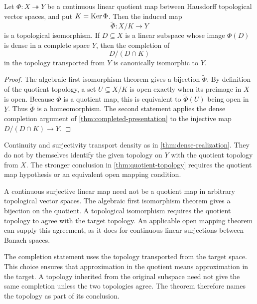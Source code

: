 \begin{theorem}
\label{thm:quotient-topology}
Let $\Phi:X\twoheadrightarrow Y$ be a continuous linear quotient map between Hausdorff topological vector spaces, and put $K=\operatorname{Ker}\Phi$.  Then the induced map
\[
\widetilde\Phi:X/K\longrightarrow Y
\]
is a topological isomorphism.  If $D\subseteq X$ is a linear subspace whose image $\Phi(D)$ is dense in a complete space $Y$, then the completion of
\[
D/(D\cap K)
\]
in the topology transported from $Y$ is canonically isomorphic to $Y$.
\end{theorem}

\begin{proof}
The algebraic first isomorphism theorem gives a bijection $\widetilde\Phi$.  By definition of the quotient topology, a set $U\subseteq X/K$ is open exactly when its preimage in $X$ is open.  Because $\Phi$ is a quotient map, this is equivalent to $\widetilde\Phi(U)$ being open in $Y$.  Thus $\widetilde\Phi$ is a homeomorphism.  The second statement applies the dense completion argument of \cref{thm:completed-presentation} to the injective map $D/(D\cap K)\to Y$.
\end{proof}

\begin{boundary}
\label{bnd:topological-quotient}
Continuity and surjectivity transport density as in \cref{thm:dense-realization}.  They do not by themselves identify the given topology on $Y$ with the quotient topology from $X$.  The stronger conclusion in \cref{thm:quotient-topology} requires the quotient map hypothesis or an equivalent open mapping condition.
\end{boundary}

\begin{warningbox}
A continuous surjective linear map need not be a quotient map in arbitrary topological vector spaces.  The algebraic first isomorphism theorem gives a bijection on the quotient.  A topological isomorphism requires the quotient topology to agree with the target topology.  An applicable open mapping theorem can supply this agreement, as it does for continuous linear surjections between Banach spaces.
\end{warningbox}

The completion statement uses the topology transported from the target space.  This choice ensures that approximation in the quotient means approximation in the target.  A topology inherited from the original subspace need not give the same completion unless the two topologies agree.  The theorem therefore names the topology as part of its conclusion.

